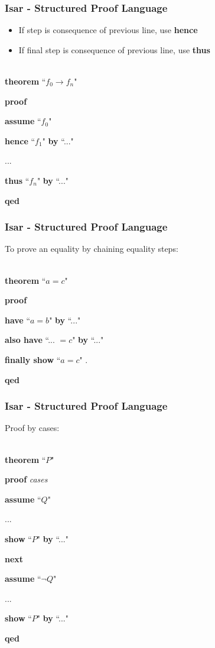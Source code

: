 \documentclass{beamer}
\renewcommand{\indent}{\hspace*{1em}}
\begin{document}
  \begin{frame}
	\frametitle{Isar - Structured Proof Language}
	\begin{itemize}
		\item If step is consequence of previous line, use \textbf{hence}
		\item If final step is consequence of previous line, use 
		\textbf{thus}\\~\
	\end{itemize}

	\textbf{theorem} ``$f_0 \rightarrow f_n$"

	\textbf{proof}

	\indent \textbf{assume} ``$f_0$"

	\indent \textbf{hence} ``$f_1$" \textbf{by} ``..."

	\indent ...

	\indent \textbf{thus} ``$f_n$" \textbf{by} ``..."

	\textbf{qed}
  \end{frame}


  \begin{frame}
	\frametitle{Isar - Structured Proof Language}
	To prove an equality by chaining equality steps:\\~\

	\textbf{theorem} ``$a = c$"

	\textbf{proof}

	\indent \textbf{have} ``$a = b$" \textbf{by} ``..."

	\indent \textbf{also have} ``... $= c$" \textbf{by} ``..."

	\indent \textbf{finally show} ``$a = c$" .

	\textbf{qed}
  \end{frame}

  \begin{frame}
	\frametitle{Isar - Structured Proof Language}
	Proof by cases:\\~\
	
	\textbf{theorem} ``$P$"
	
	\textbf{proof} \textit{cases}
	
	\indent \textbf{assume} ``$Q$"
	
	\indent ...

	\indent \textbf{show} ``$P$" \textbf{by} ``..."
	
	\textbf{next}
	
	\indent \textbf{assume} ``$\lnot Q$"
	
	\indent ...
	
	\indent \textbf{show} ``$P$" \textbf{by} ``..."
	
	\textbf{qed}
  \end{frame}
\end{document}
